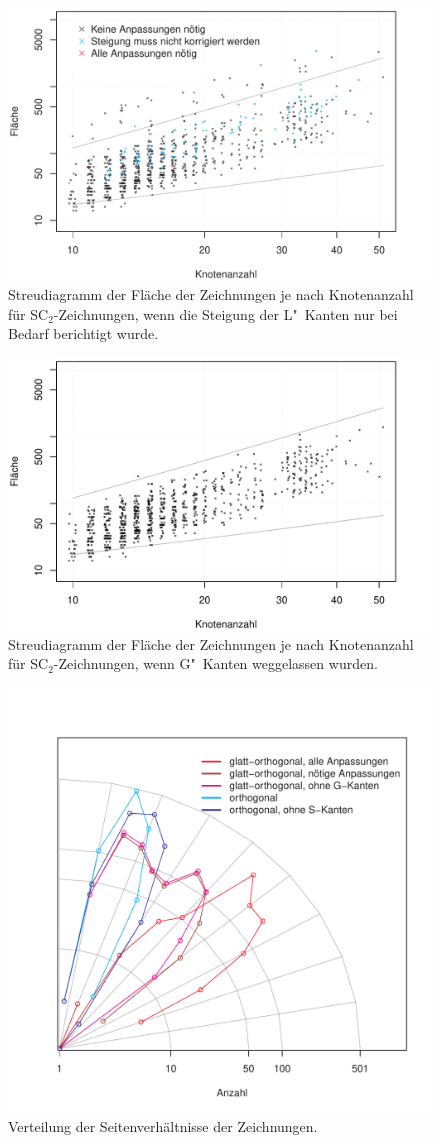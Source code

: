 \documentclass[a4paper]{scrreprt}
\theoremstyle{definition}
\begin{document}
\begin{figure}[h]
  \centering
  \includegraphics[width=.9\textwidth]{plots/area_smooth_bst}
  \caption{Streudiagramm der Fläche der Zeichnungen je nach Knotenanzahl für SC$_2$-Zeichnungen, wenn die Steigung der L"~Kanten nur bei Bedarf berichtigt wurde.}
  \label{fig:smooth-opti}
\end{figure}

\begin{figure}[h]
  \centering
  \includegraphics[width=.9\textwidth]{plots/area_smooth_noG}
  \caption{Streudiagramm der Fläche der Zeichnungen je nach Knotenanzahl für SC$_2$-Zeichnungen, wenn G"~Kanten weggelassen wurden.}
  \label{fig:smooth-noG}
\end{figure}
\begin{figure}[h]
  \centering
  \includegraphics[width=.6\textwidth]{plots/angles_comparison}
  \caption{Verteilung der Seitenverhältnisse der Zeichnungen.}
  \label{fig:angleComparison}
\end{figure}
\end{document}
